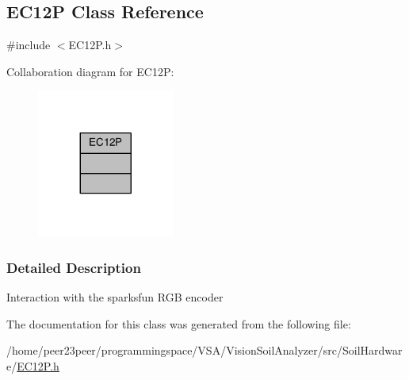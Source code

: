 \hypertarget{class_e_c12_p}{}\subsection{E\+C12\+P Class Reference}
\label{class_e_c12_p}


{\ttfamily \#include $<$E\+C12\+P.\+h$>$}



Collaboration diagram for E\+C12\+P\+:
\nopagebreak
\begin{figure}[H]
\begin{center}
\leavevmode
\includegraphics[width=128pt]{class_e_c12_p__coll__graph}
\end{center}
\end{figure}


\subsubsection{Detailed Description}
Interaction with the sparksfun R\+G\+B encoder 

The documentation for this class was generated from the following file\+:\begin{DoxyCompactItemize}
\item 
/home/peer23peer/programmingspace/\+V\+S\+A/\+Vision\+Soil\+Analyzer/src/\+Soil\+Hardware/\hyperlink{_e_c12_p_8h}{E\+C12\+P.\+h}\end{DoxyCompactItemize}
